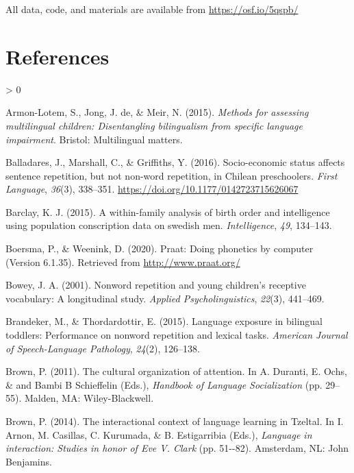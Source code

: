 \documentclass[
  english,
  ,man,floatsintext]{apa6}
\newlength{\cslhangindent}
\newenvironment{CSLReferences}[2] %
 {%
  \setlength{\parindent}{0pt}
  \ifodd #1 \everypar{\setlength{\hangindent}{\cslhangindent}}\ignorespaces\fi
  \ifnum #2 > 0
  \setlength{\parskip}{#2\baselineskip}
  \fi
 }%
 {}
\begin{document}
All data, code, and materials are available from \url{https://osf.io/5qspb/}

\hypertarget{references}{%
\section{References}\label{references}}

\setlength{\parindent}{-0.5in}
\setlength{\leftskip}{0.5in}

\hypertarget{refs}{}
\begin{CSLReferences}{1}{0}
\leavevmode\hypertarget{ref-armon2015assessing}{}%
Armon-Lotem, S., Jong, J. de, \& Meir, N. (2015). \emph{Methods for assessing multilingual children: Disentangling bilingualism from specific language impairment}. Bristol: Multilingual matters.

\leavevmode\hypertarget{ref-balladares2016socio}{}%
Balladares, J., Marshall, C., \& Griffiths, Y. (2016). {Socio-economic status affects sentence repetition, but not non-word repetition, in Chilean preschoolers}. \emph{{First Language}}, \emph{36}(3), 338--351. \url{https://doi.org/10.1177/0142723715626067}

\leavevmode\hypertarget{ref-barclay2015within}{}%
Barclay, K. J. (2015). A within-family analysis of birth order and intelligence using population conscription data on swedish men. \emph{Intelligence}, \emph{49}, 134--143.

\leavevmode\hypertarget{ref-Praat}{}%
Boersma, P., \& Weenink, D. (2020). Praat: Doing phonetics by computer (Version 6.1.35). Retrieved from \url{http://www.praat.org/}

\leavevmode\hypertarget{ref-bowey2001nonword}{}%
Bowey, J. A. (2001). Nonword repetition and young children's receptive vocabulary: A longitudinal study. \emph{Applied Psycholinguistics}, \emph{22}(3), 441--469.

\leavevmode\hypertarget{ref-brandeker2015language}{}%
Brandeker, M., \& Thordardottir, E. (2015). Language exposure in bilingual toddlers: Performance on nonword repetition and lexical tasks. \emph{American Journal of Speech-Language Pathology}, \emph{24}(2), 126--138.

\leavevmode\hypertarget{ref-brown2011cultural}{}%
Brown, P. (2011). The cultural organization of attention. In A. Duranti, E. Ochs, \& and Bambi B Schieffelin (Eds.), \emph{Handbook of {Language Socialization}} (pp. 29--55). Malden, MA: Wiley-Blackwell.

\leavevmode\hypertarget{ref-brown2014interactional}{}%
Brown, P. (2014). The interactional context of language learning in {T}zeltal. In I. Arnon, M. Casillas, C. Kurumada, \& B. Estigarribia (Eds.), \emph{Language in interaction: Studies in honor of {Eve V. Clark}} (pp. 51-\/-82). Amsterdam, NL: John Benjamins.


\end{CSLReferences}
\end{document}
